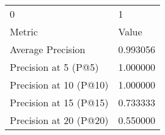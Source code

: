 \begin{tabular}{ll}
0 & 1 \\
Metric & Value \\
Average Precision & 0.993056 \\
Precision at 5 (P@5) & 1.000000 \\
Precision at 10 (P@10) & 1.000000 \\
Precision at 15 (P@15) & 0.733333 \\
Precision at 20 (P@20) & 0.550000 \\
\end{tabular}
